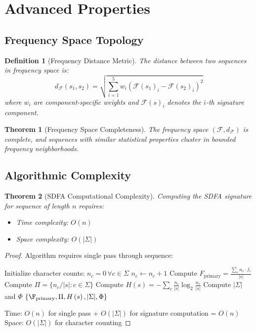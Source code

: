 \documentclass[12pt]{article}
\newtheorem{theorem}{Theorem}
\newtheorem{definition}{Definition}
\newcommand{\sdfa}{\textsc{SDFA}}
\newcommand{\freqspace}{\mathcal{F}}
\newcommand{\Entropy}[1]{H\left(#1\right)}
\newcommand{\FreqMap}{\mathcal{F}}
\begin{document}
\section{Advanced Properties}

\subsection{Frequency Space Topology}

\begin{definition}[Frequency Distance Metric]
The distance between two sequences in frequency space is:
\begin{equation}
d_{\freqspace}(s_1, s_2) = \sqrt{\sum_{i=1}^{5} w_i \left( \FreqMap(s_1)_i - \FreqMap(s_2)_i \right)^2}
\end{equation}
where $w_i$ are component-specific weights and $\FreqMap(s)_i$ denotes the $i$-th signature component.
\end{definition}

\begin{theorem}[Frequency Space Completeness]
The frequency space $(\freqspace, d_{\freqspace})$ is complete, and sequences with similar statistical properties cluster in bounded frequency neighborhoods.
\end{theorem}

\subsection{Algorithmic Complexity}

\begin{theorem}[\sdfa{} Computational Complexity]
Computing the \sdfa{} signature for sequence of length $n$ requires:
\begin{itemize}
\item Time complexity: $O(n)$
\item Space complexity: $O(|\Sigma|)$
\end{itemize}
\end{theorem}

\begin{proof}
Algorithm requires single pass through sequence:

\begin{algorithm}[H]
\caption{\sdfa{} Signature Computation}
\begin{algorithmic}[1]
\STATE Initialize character counts: $n_c = 0 \, \forall c \in \Sigma$
    \STATE $n_c \leftarrow n_c + 1$
\ENDFOR
\STATE Compute $F_{\text{primary}} = \frac{\sum_c n_c \cdot f_c}{|s|}$
\STATE Compute $\Pi = \{n_c / |s| : c \in \Sigma\}$
\STATE Compute $\Entropy{s} = -\sum_c \frac{n_c}{|s|} \log_2 \frac{n_c}{|s|}$
\STATE Compute $|\Sigma|$ and $\Phi$
\RETURN $\{\F_{\text{primary}}, \Pi, \Entropy{s}, |\Sigma|, \Phi\}$
\end{algorithmic}
\end{algorithm}

Time: $O(n)$ for single pass + $O(|\Sigma|)$ for signature computation = $O(n)$ \\
Space: $O(|\Sigma|)$ for character counting
\end{proof}
\end{document}

